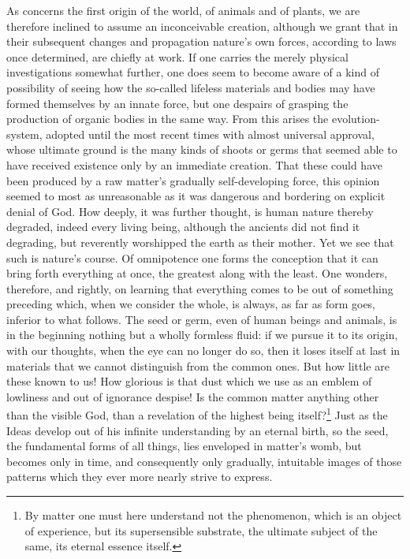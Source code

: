 \documentclass[12pt,a4paper,openany]{book}
\newcommand{\opage}[1]{\marginnote{\footnotesize\textit{[#1]}}}
\begin{document}
As concerns the first origin of the world, of animals and of plants, we are
therefore inclined to assume an inconceivable creation, although we grant that in
their subsequent changes and propagation nature's own forces, according to laws once
determined, are chiefly at work. If one carries the merely physical investigations
somewhat further, one does seem to become aware of a kind of possibility of seeing
how the so-called lifeless materials and bodies may have formed themselves by an
innate force, but one despairs of grasping the production of organic bodies in the
same way. From this arises the evolution-system, adopted until the most recent times
with almost universal approval, whose ultimate ground is the many kinds of shoots
or germs that seemed able to have received existence only by an immediate creation.
That these could have been produced by a raw matter's gradually self-developing
force, this opinion seemed to most as unreasonable as it was dangerous and bordering
on explicit denial of God. How deeply, it was further thought, is human nature
thereby degraded, indeed every living being, although the ancients did not find it
degrading, but reverently worshipped the earth as their mother. Yet we see that such
is nature's course. Of omnipotence one forms the conception that it can bring forth
everything at once, the greatest along with the least. One wonders, therefore, and
rightly, on learning that everything comes to be out of something preceding which,
when we consider the whole, is always, as far as form goes, inferior to what
follows. The seed or germ, even of human beings and animals, is in the beginning
nothing but a wholly formless fluid: if we pursue it to its origin, with our
thoughts, when the eye can no longer do so, then it loses itself at last in
materials that we
\setcounter{footnote}{0}%
\opage{110}cannot distinguish from the common ones. But how little are these known to us!
How glorious is that dust which we use as an emblem of lowliness and out of
ignorance despise! Is the common matter anything other than the visible God, than a
revelation of the highest being itself?\footnote[1]{By matter one must here
understand not the phenomenon, which is an object of experience, but its
supersensible substrate, the ultimate subject of the same, its eternal essence
itself.} Just as the Ideas develop out of his infinite understanding by an eternal
birth, so the seed, the fundamental forms of all things, lies enveloped in matter's
womb, but becomes only in time, and consequently only gradually, intuitable images
of those patterns which they ever more nearly strive to express.
\end{document}
